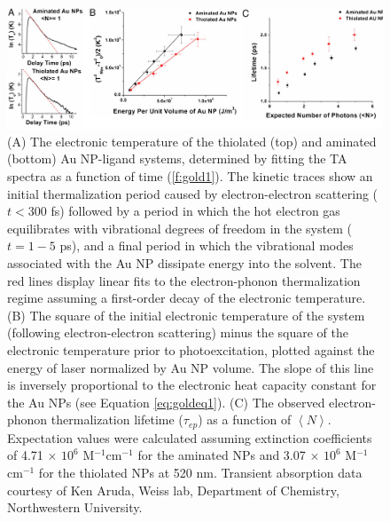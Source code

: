 \begin{figure}
\begin{center}
\includegraphics[width=\textwidth]{./Chapter2/gold2.jpg}
\caption[Measurements of hot electron cooling parameters for thiolated and aminated gold nanoparticles.]{(A) The electronic temperature of the thiolated (top) and aminated (bottom) Au NP-ligand systems, determined by fitting the TA spectra as a function of time (\ref{f:gold1}). The kinetic traces show an initial thermalization period caused by electron-electron scattering ($t < 300$ fs) followed by a period in which the hot electron gas equilibrates with vibrational degrees of freedom in the system ($t = 1-5$ ps), and a final period in which the vibrational modes associated with the Au NP dissipate energy into the solvent. The red lines display linear fits to the electron-phonon thermalization regime assuming a first-order decay of the electronic temperature. (B) The square of the initial electronic temperature of the system (following electron-electron scattering) minus the square of the electronic temperature prior to photoexcitation, plotted against the energy of laser normalized by Au NP volume. The slope of this line is inversely proportional to the electronic heat capacity constant for the Au NPs (see Equation \ref{eq:goldeq1}). (C) The observed electron-phonon thermalization lifetime ($\tau_{ep}$) as a function of $\left\langle N\right\rangle$. Expectation values were calculated assuming extinction coefficients of 4.71 $\times$ $10^6$ M$^{-1}$cm$^{-1}$ for the aminated NPs and 3.07 $\times$ $10^6$ M$^{-1}$cm$^{-1}$ for the thiolated NPs at 520 nm. Transient absorption data courtesy of Ken Aruda, Weiss lab, Department of Chemistry, Northwestern University.}
\label{f:gold2}
\end{center}
\end{figure}

